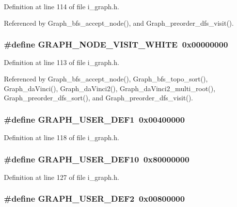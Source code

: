 Definition at line 114 of file i\_\-graph.h.

Referenced by Graph\_\-bfs\_\-accept\_\-node(), and Graph\_\-preorder\_\-dfs\_\-visit().
\subsubsection{\setlength{\rightskip}{0pt plus 5cm}\#define GRAPH\_\-NODE\_\-VISIT\_\-WHITE~0x00000000}\label{i__graph_8h_3ce296182cb7b395f7d71823024fdc7f}




Definition at line 113 of file i\_\-graph.h.

Referenced by Graph\_\-bfs\_\-accept\_\-node(), Graph\_\-bfs\_\-topo\_\-sort(), Graph\_\-da\-Vinci(), Graph\_\-da\-Vinci2(), Graph\_\-da\-Vinci2\_\-multi\_\-root(), Graph\_\-preorder\_\-dfs\_\-sort(), and Graph\_\-preorder\_\-dfs\_\-visit().
\subsubsection{\setlength{\rightskip}{0pt plus 5cm}\#define GRAPH\_\-USER\_\-DEF1~0x00400000}\label{i__graph_8h_d16dcfff39a2100d78afd749a6fd438e}




Definition at line 118 of file i\_\-graph.h.
\subsubsection{\setlength{\rightskip}{0pt plus 5cm}\#define GRAPH\_\-USER\_\-DEF10~0x80000000}\label{i__graph_8h_da2f2779cb5752ff9227e2e11afe173a}




Definition at line 127 of file i\_\-graph.h.
\subsubsection{\setlength{\rightskip}{0pt plus 5cm}\#define GRAPH\_\-USER\_\-DEF2~0x00800000}\label{i__graph_8h_6b182555964bcba86e323bffa58e1d21}




